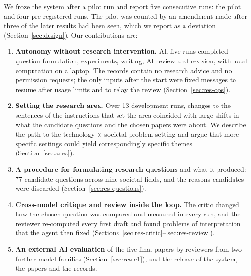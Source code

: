 \documentclass[11pt]{article}
\begin{document}
We froze the system after a pilot run and report five consecutive runs: the pilot and four pre-registered runs. The pilot was counted by an amendment made after three of the later results had been seen, which we report as a deviation (Section~\ref{sec:design}). Our contributions are:
\begin{enumerate}[leftmargin=*,itemsep=2pt]
  \item \textbf{Autonomy without research intervention.} All five runs completed question formulation, experiments, writing, AI review and revision, with local computation on a laptop. The records contain no research advice and no permission requests; the only inputs after the start were fixed messages to resume after usage limits and to relay the review (Section~\ref{sec:res-ops}).
  \item \textbf{Setting the research area.} Over 13 development runs, changes to the sentences of the instructions that set the area coincided with large shifts in what the candidate questions and the chosen papers were about. We describe the path to the technology $\times$ societal-problem setting and argue that more specific settings could yield correspondingly specific themes (Section~\ref{sec:area}).
  \item \textbf{A procedure for formulating research questions} and what it produced: 77 candidate questions across nine societal fields, and the reasons candidates were discarded (Section~\ref{sec:res-questions}).
  \item \textbf{Cross-model critique and review inside the loop.} The critic changed how the chosen question was compared and measured in every run, and the reviewer re-computed every first draft and found problems of interpretation that the agent then fixed (Sections~\ref{sec:res-critic}--\ref{sec:res-review}).
  \item \textbf{An external AI evaluation} of the five final papers by reviewers from two further model families (Section~\ref{sec:res-e1}), and the release of the system, the papers and the records.
\end{enumerate}
\end{document}
